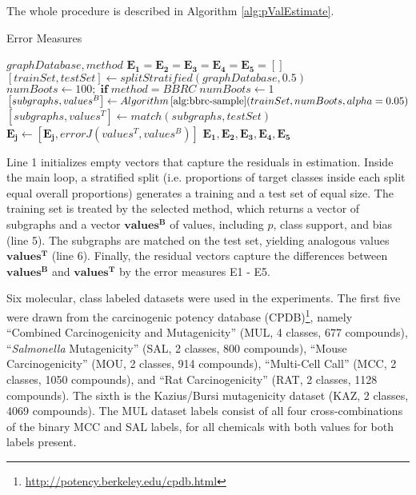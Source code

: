 \documentclass{article}
\begin{document}
The whole procedure is described in Algorithm \ref{alg:pValEstimate}.
\begin{algorithm}[t]
  \caption{Error Measures}
  \label{alg:pValEstimate}
  {\small \begin{algorithmic}[1]
  \Require $graphDatabase, method$ 
  \State $\mathbf{E_1}=\mathbf{E_2}=\mathbf{E_3}=\mathbf{E_4}=\mathbf{E_5}=\left[ \right]$
    \State $[trainSet, testSet] \gets splitStratified(graphDatabase,0.5)$ 
    \State $numBoots \gets 100;\;\textbf{if}\; method=BBRC\; numBoots \gets 1$
    \State $\left[ subgraphs, values^B \right] \gets Algorithm\,\ref{alg:bbrc-sample}(trainSet,numBoots,alpha=0.05)$ 
    \State $\left[ subgraphs, values^T \right] \gets match(subgraphs, testSet)$ 
      \State $ \mathbf{E_j} \gets \left[ \mathbf{E_j}, errorJ(values^T, values^B) \right]$
    \EndFor
  \EndFor
  \Ensure $\mathbf{E_1},\mathbf{E_2},\mathbf{E_3},\mathbf{E_4},\mathbf{E_5}$
\end{algorithmic}}
\end{algorithm}

Line 1 initializes empty vectors that capture the residuals in estimation.
Inside the main loop, a stratified split (i.e. proportions of target classes
inside each split equal overall proportions) generates a training and a test
set of equal size. The training set is treated by the selected method, which
returns a vector of subgraphs and a vector $\mathbf{values^B}$ of values,
including $p$, class support, and bias (line 5). The subgraphs are matched on
the test set, yielding analogous values $\mathbf{values^T}$ (line 6). Finally, the
residual vectors capture the differences between $\mathbf{values^B}$ and
$\mathbf{values^T}$ by the error measures E1 - E5.

Six molecular, class labeled datasets were used in the experiments. The first
five were drawn from the carcinogenic potency database
(CPDB)\footnote{\url{http://potency.berkeley.edu/cpdb.html}}, namely ``Combined
Carcinogenicity and Mutagenicity'' (MUL, 4 classes, 677 compounds),
``\emph{Salmonella} Mutagenicity'' (SAL, 2 classes, 800 compounds), ``Mouse
Carcinogenicity'' (MOU, 2 classes, 914 compounds), ``Multi-Cell Call'' (MCC, 2
classes, 1050 compounds), and ``Rat Carcinogenicity'' (RAT, 2 classes, 1128
compounds). The sixth is the Kazius/Bursi mutagenicity dataset
\cite{kazius05derivation} (KAZ, 2 classes, 4069 compounds).  The MUL dataset
labels consist of all four cross-combinations of the binary MCC and SAL labels,
for all chemicals with both values for both labels present.
\end{document}

